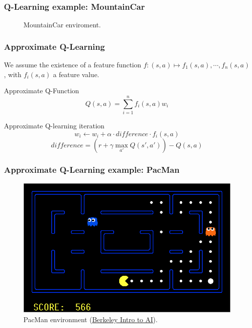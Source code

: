 \documentclass{beamer}
\begin{document}
        \begin{frame}
            \frametitle{Q-Learning example: MountainCar}
            \begin{figure}
                \centering
                \label{fig7:mountain}
                \caption{MountainCar enviroment.}
            \end{figure}
        \end{frame}

        \begin{frame}
            \frametitle{Approximate Q-Learning}
            We assume the existence of a feature function $f: (s, a) \mapsto f_1(s, a), \cdots, f_n(s, a)$, with $f_i(s, a)$ a feature value.
            \begin{block}{Approximate Q-Function}
                $$Q(s, a) = \sum_{i = 1}^n f_i(s, a) w_i$$
            \end{block}
            \begin{block}{Approximate Q-learning iteration}
                $$w_i \leftarrow w_i + \alpha \cdot difference \cdot f_i(s, a)$$
                $$difference = (r + \gamma \max_{a'} Q(s', a')) - Q(s, a)$$
            \end{block}
        \end{frame}

        \begin{frame}
            \frametitle{Approximate Q-Learning example: PacMan}
            \begin{figure}
                \centering  
                \includegraphics[width=0.8\linewidth]{figures/pacman.png}              
                \caption{PacMan environment (\href{http://ai.berkeley.edu/reinforcement.html}{Berkeley Intro to AI}).}
                \label{fig8:pacman}
            \end{figure}
        \end{frame}
\end{document}
